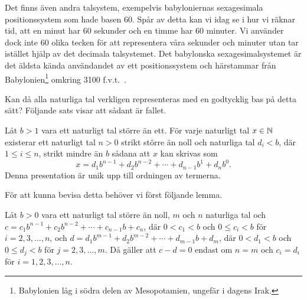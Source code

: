 Det finns även andra talsystem, exempelvis babyloniernas
sexagesimala positionssystem
 som hade basen \(60\).
Spår av detta kan vi idag se i hur vi räknar tid, att en minut har 60
sekunder och en timme har 60 minuter.
Vi använder dock inte 60 olika tecken för att representera våra sekunder och
minuter utan tar istället hjälp av det decimala talsystemet.
Det babylonska sexagesimalsystemet är det äldsta kända användandet av ett
positionssystem och härstammar från Babylonien\footnote{Babylonien låg i
södra delen av Mesopotamien, ungefär i dagens Irak.} omkring 3100 f.v.t.\  
\cite{Kline1990mtf1}.

Kan då alla naturliga tal verkligen representeras med en godtycklig bas på
detta sätt?
Följande sats visar att sådant är fallet.
\begin{theorem}\label{thm:PositionssystemAllaUnika}
  Låt \(b>1\) vara ett naturligt tal större än ett.
  För varje naturligt tal \(x\in\mathbb{N}\) existerar ett naturligt tal \(n>0\)
  strikt större än noll och naturliga tal \(d_i<b\), där \(1\leq i\leq n\),
  strikt mindre än \(b\) sådana att \(x\) kan skrivas som
  \begin{equation*}
    x = d_1 b^{n-1} + d_2 b^{n-2} + \cdots + d_{n-1} b^1 + d_n b^0.
  \end{equation*}
  Denna presentation är unik upp till ordningen av termerna.
\end{theorem}
För att kunna bevisa detta behöver vi först följande lemma.
\begin{lemma}\label{lem:NollEndastOmLika}
  Låt \(b>0\) vara ett naturligt tal större än noll, \(m\) och \(n\)
  naturliga tal och \(c=c_1b^{n-1}+c_2b^{n-2}+\cdots+c_{n-1}b+c_n\), där
  \(0<c_1<b\) och \(0\leq c_i<b\) för \(i=2,3,\ldots,n\), och
  \(d=d_1b^{m-1}+d_2b^{m-2}+\cdots+d_{m-1}b+d_m\), där \(0<d_1<b\) och \(0\leq
  d_j<b\) för \(j=2,3,\ldots,m\).
  Då gäller att \(c-d=0\) endast om \(n=m\) och \(c_i=d_i\) för
  \(i=1,2,3,\ldots,n\).
\end{lemma}
